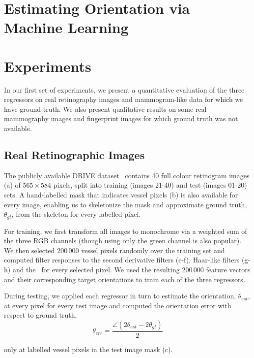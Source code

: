 \section{Estimating Orientation via Machine Learning}
\label{s:learning}


\section{Experiments}
\label{s:expts}
In our first set of experiments, we present a quantitative evaluation of the three regressors on real retinography images and mammogram-like data for which we have ground truth. We also present qualitative results on some real mammography images and fingerprint images for which ground truth was not available.


\subsection{Real Retinographic Images}
\label{s:expts_retinography}
The publicly available DRIVE dataset~\cite{Staal_etal_TMI04} contains 40 full colour retinogram images (a) of $565{\times}584$ pixels, split into training (images 21-40) and test (images 01-20) sets. A hand-labelled mask that indicates vessel pixels (b) is also available for every image, enabling us to skeletonize the mask and approximate ground truth, $\theta_{gt}$, from the skeleton for every labelled pixel.

For training, we first transform all images to monochrome via a weighted sum of the three RGB channels (though using only the green channel is also popular). We then selected 200\,000 vessel pixels randomly over the training set and computed filter responses to the second derivative filters (e-f), Haar-like filters (g-h) and the \dtcwt~for every selected pixel. We used the resulting 200\,000 feature vectors and their corresponding target orientations to train each of the three regressors.

During testing, we applied each regressor in turn to estimate the orientation, $\theta_{est}$, at every pixel for every test image and computed the orientation error with respect to ground truth,
%
\begin{equation}
	\theta_{err} = \frac{\angle(2\theta_{est}-2\theta_{gt})}{2}
\end{equation}

\noindent only at labelled vessel pixels in the test image mask (c).

